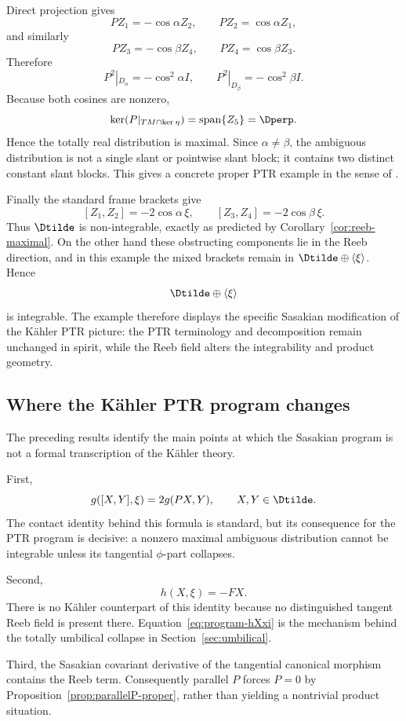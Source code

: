 \documentclass[11pt]{article}
\theoremstyle{definition}\newtheorem{definition}[theorem]{Definition}\newtheorem{example}[theorem]{Example}
\theoremstyle{remark}\newtheorem{remark}[theorem]{Remark}
\begin{document}
Direct projection gives
\[
 PZ_1=-\cos\alpha Z_2,\qquad PZ_2=\cos\alpha Z_1,
\]
and similarly
\[
 PZ_3=-\cos\beta Z_4,\qquad PZ_4=\cos\beta Z_3.
\]
Therefore
\[
 P^2|_{D_\alpha}=-\cos^2\alpha I,
 \qquad P^2|_{D_\beta}=-\cos^2\beta I.
\]
Because both cosines are nonzero,
\[
 \ker(P|_{TM\cap\ker\eta})=\operatorname{span}\{Z_5\}=\Dperp.
\]
Hence the totally real distribution is maximal. Since $\alpha\ne\beta$, the ambiguous distribution is not a single slant or pointwise slant block; it contains two distinct constant slant blocks. This gives a concrete proper PTR example in the sense of .

Finally the standard frame brackets give
\[
 [Z_1,Z_2]=-2\cos\alpha\,\xi,
 \qquad [Z_3,Z_4]=-2\cos\beta\,\xi.
\]
Thus $\Dtilde$ is non-integrable, exactly as predicted by Corollary~\ref{cor:reeb-maximal}. On the other hand these obstructing components lie in the Reeb direction, and in this example the mixed brackets remain in $\Dtilde\oplus\langle\xi\rangle$. Hence
\[
 \Dtilde\oplus\langle\xi\rangle
\]
is integrable. The example therefore displays the specific Sasakian modification of the K\"ahler PTR picture: the PTR terminology and decomposition remain unchanged in spirit, while the Reeb field alters the integrability and product geometry.



\subsection{Where the K\"ahler PTR program changes}\label{subsec:program-divergence}

The preceding results identify the main points at which the Sasakian
program is not a formal transcription of the K\"ahler theory.

First,
\[
g([X,Y],\xi)=2g(PX,Y),\qquad X,Y\in\Dtilde.
\]
The contact identity behind this formula is standard, but its consequence
for the PTR program is decisive: a nonzero maximal ambiguous distribution
cannot be integrable unless its tangential \(\phi\)-part collapses.

Second,
\begin{equation}\label{eq:program-hXxi}
h(X,\xi)=-FX.
\end{equation}
There is no K\"ahler counterpart of this identity because no distinguished
tangent Reeb field is present there.  Equation~\eqref{eq:program-hXxi}
is the mechanism behind the totally umbilical collapse in
Section~\ref{sec:umbilical}.

Third, the Sasakian covariant derivative of the tangential canonical
morphism contains the Reeb term.  Consequently parallel \(P\) forces
\(P=0\) by Proposition~\ref{prop:parallelP-proper}, rather than yielding a nontrivial product situation.
\end{document}
